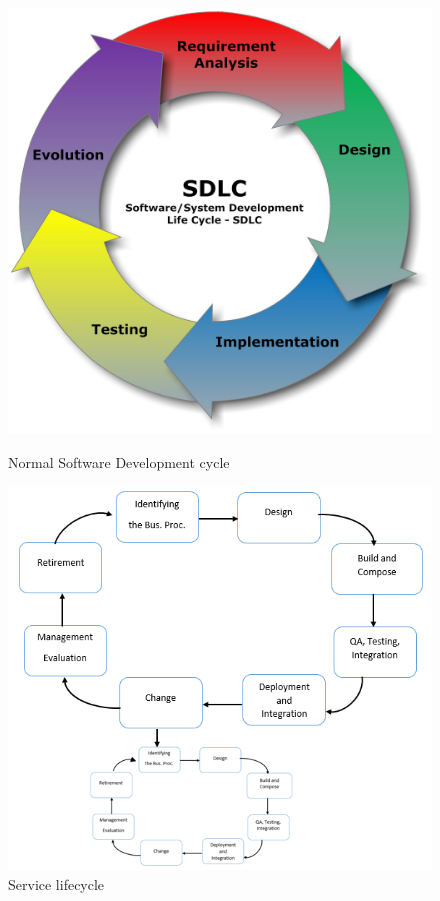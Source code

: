 \documentclass[12pt]{article}
\begin{document}
\begin{figure}[here!]
\centering
\begin{minipage}[h]{0.3\textwidth}
\centering
    \includegraphics[width=1.0\textwidth]{images/sdlc}
    \caption{Normal Software Development cycle \cite{muede2}}
    \label{fig:asdas}
\end{minipage}
\begin{minipage}[h]{0.14\textwidth}
\vfill
\end{minipage}
\begin{minipage}[h]{0.55\textwidth}
\centering
\includegraphics[width=1.0\textwidth]{images/servicelcy2}
	\caption{Service lifecycle \cite{javawebservice}}
	\label{fig:Servicelifecycle}
\end{minipage}
\end{figure}
\FloatBarrier	
\newpage
\end{document}
